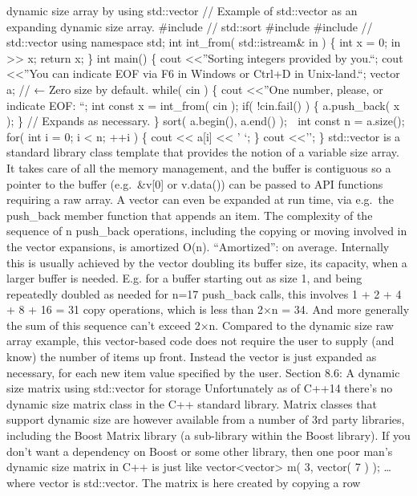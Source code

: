dynamic size array by using std::vector // Example of std::vector as an
expanding dynamic size array. \#include // std::sort \#include \#include
// std::vector using namespace std; int int\_from( std::istream\& in )
\{ int x = 0; in \textgreater\textgreater{} x; return x; \} int main()
\{ cout \textless\textless{}''Sorting integers provided by you.\n``;
cout \textless\textless{}''You can indicate EOF via F6 in Windows or
Ctrl+D in Unix-land.\n``; vector a; // ← Zero size by default. while(
cin ) \{ cout \textless\textless{}''One number, please, or indicate EOF:
``; int const x = int\_from( cin ); if( !cin.fail() ) \{ a.push\_back( x
); \} // Expands as necessary. \} sort( a.begin(), a.end() );  int
const n = a.size(); for( int i = 0; i \textless{} n; ++i ) \{ cout
\textless\textless{} a{[}i{]} \textless\textless{} ' `; \} cout
\textless\textless{}'\n'; \} std::vector is a standard library class
template that provides the notion of a variable size array. It takes
care of all the memory management, and the buffer is contiguous so a
pointer to the buffer (e.g.~\&v{[}0{]} or v.data()) can be passed to API
functions requiring a raw array. A vector can even be expanded at run
time, via e.g.~the push\_back member function that appends an item. The
complexity of the sequence of n push\_back operations, including the
copying or moving involved in the vector expansions, is amortized O(n).
``Amortized'': on average. Internally this is usually achieved by the
vector doubling its buffer size, its capacity, when a larger buffer is
needed. E.g. for a buffer starting out as size 1, and being repeatedly
doubled as needed for n=17 push\_back calls, this involves 1 + 2 + 4 + 8
+ 16 = 31 copy operations, which is less than 2×n = 34. And more
generally the sum of this sequence can't exceed 2×n. Compared to the
dynamic size raw array example, this vector-based code does not require
the user to supply (and know) the number of items up front. Instead the
vector is just expanded as necessary, for each new item value specified
by the user. Section 8.6: A dynamic size matrix using std::vector for
storage Unfortunately as of C++14 there's no dynamic size matrix class
in the C++ standard library. Matrix classes that support dynamic size
are however available from a number of 3rd party libraries, including
the Boost Matrix library (a sub-library within the Boost library). If
you don't want a dependency on Boost or some other library, then one
poor man's dynamic size matrix in C++ is just like
vector\textless vector\textgreater{} m( 3, vector( 7 ) ); \ldots{} where
vector is std::vector. The matrix is here created by copying a row
